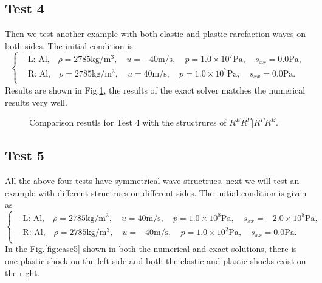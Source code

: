 \documentclass{article}
\numberwithin{equation}{section}
\numberwithin{table}{section}
\begin{document}
\subsection{Test 4}
Then we test another example with both elastic and plastic rarefaction  waves on both sides. The initial condition is
\begin{equation}
 \left\{ \begin{aligned}
	 &	 \text{L: Al,}\quad  \rho = 2785 \text{kg}/\text{m}^3, \quad  u = -40\text{m}/\text{s}, \quad  p = 1.0\times 10^7 \text{Pa}, \quad  s_{xx}=0.0 \text{Pa},\\
	 &	 \text{R: Al,}\quad  \rho = 2785 \text{kg}/\text{m}^3, \quad  u = 40\text{m}/\text{s}, \quad  p = 1.0\times 10^7\text{Pa}, \quad  s_{xx}=0.0 \text{Pa}.\\
   \end{aligned}
 \right.
\end{equation}
Results are shown in Fig.\ref{fig:case4},  the results of the exact solver matches the numerical results very well.

\begin{figure}
  \centering


    \caption{Comparison resutls for Test 4 with the structrures of $R^ER^P|R^PR^E$.  }
  \label{fig:case4}
\end{figure}
\subsection{Test 5}
All the above four tests have symmetrical wave  structrues, next we will test an example with different structrues on different sides. The initial condition is given as
\begin{equation}
 \left\{ \begin{aligned}
&	 \text{L: Al,}\quad  \rho = 2785 \text{kg}/\text{m}^3, \quad  u = 40\text{m}/\text{s}, \quad  p = 1.0\times 10^8\text{Pa}, \quad  s_{xx}=-2.0\times 10^8 \text{Pa},\\
&	 \text{R: Al,}\quad  \rho = 2785 \text{kg}/\text{m}^3, \quad  u = -40\text{m}/\text{s}, \quad  p = 1.0 \times 10^2 \text{Pa}, \quad  s_{xx}=0.0\text{Pa}.\\
   \end{aligned}
 \right.
\end{equation}
In the Fig.\ref{fig:case5} shown in both the numerical and exact solutions, there is one plastic shock on the left side and both the elastic and plastic shocks exist on the right.
\end{document}
